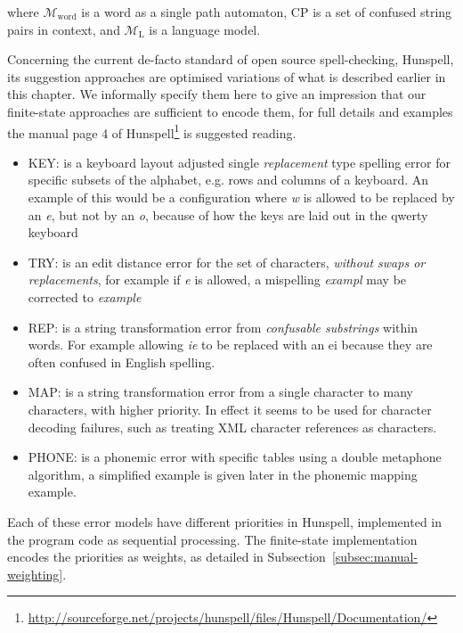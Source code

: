 \documentclass[a4paper,12pt]{article}
\begin{document}
where $\mathcal{M}_{\mathrm{word}}$ is a word as a single path automaton,
$\mathrm{CP}$ is a set of confused string pairs in context, and
$\mathcal{M}_{\mathrm{L}}$ is a language model.

Concerning the current de-facto standard of open source spell-checking,
Hunspell, its suggestion approaches are optimised variations of what is
described earlier in this chapter. We informally specify them here to
give an impression that our finite-state approaches are sufficient to encode
them, for full details and examples the manual page 4 of
Hunspell\footnote{\url{http://sourceforge.net/projects/hunspell/files/Hunspell/Documentation/}} is suggested reading.

\begin{itemize}
    \item KEY: is a keyboard layout adjusted single \emph{replacement} type
        spelling error for specific subsets of the alphabet, e.g. rows and 
        columns of a keyboard. An example of this would be a configuration
        where \emph{w} is allowed to be replaced by an \emph{e}, but not
        by an \emph{o}, because of how the keys are laid out in the qwerty
        keyboard
    \item TRY: is an edit distance error for the set of characters, 
        \emph{without swaps or replacements}, for example if \emph{e} is
        allowed, a mispelling \emph{exampl} may be corrected to \emph{example}
    \item REP: is a string transformation error from \emph{confusable
        substrings} within words. For example allowing \emph{ie} to be replaced
        with an {ei} because they are often confused in English spelling.
    \item MAP: is a string transformation error from a single character to 
        many characters, with higher priority. In effect it seems to be
        used for character decoding failures, such as treating XML character
        references as characters.
    \item PHONE: is a phonemic error with specific tables using a double
        metaphone algorithm, a simplified example is given later in the
        phonemic mapping example.
\end{itemize}

Each of these error models have different priorities in Hunspell, implemented
in the program code as sequential processing. The finite-state implementation
encodes the priorities as weights, as detailed in
Subsection~\ref{subsec:manual-weighting}.
\end{document}
